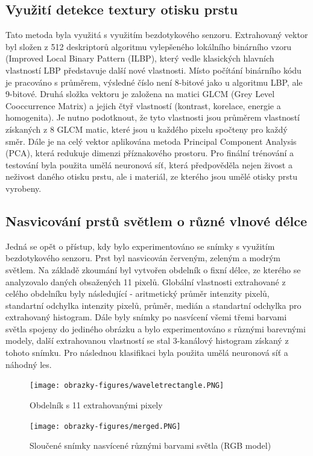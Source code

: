 \subsection*{Využití detekce textury otisku prstu}
Tato metoda byla využitá s využitím bezdotykového senzoru. Extrahovaný vektor byl složen z 512 deskriptorů algoritmu vylepšeného lokálního binárního vzoru (Improved Local Binary Pattern (ILBP), který vedle klasických hlavních vlastností LBP představuje další nové vlastnosti. Místo počítání binárního kódu je pracováno s průměrem, výsledné číslo není 8-bitové jako u algoritmu LBP, ale 9-bitové. Druhá složka vektoru je založena na matici GLCM (Grey Level Cooccurrence Matrix) a jejich čtyř vlastností (kontrast, korelace, energie a homogenita). Je nutno podotknout, že tyto vlastnosti jsou průměrem vlastností získaných z 8 GLCM matic, které jsou u každého pixelu spočteny pro každý směr. Dále je na celý vektor aplikována metoda Principal Component Analysis (PCA), která redukuje dimenzi příznakového prostoru. Pro finální trénování a testování byla použita umělá neuronová síť, která předpověděla nejen živost a neživost daného otisku prstu, ale i materiál, ze kterého jsou umělé otisky prstu vyrobeny. \cite{TouchlessANN}

\subsection*{Nasvicování prstů světlem o různé vlnové délce}
Jedná se opět o přístup, kdy bylo experimentováno se snímky s využitím bezdotykového senzoru. Prst byl nasvicován červeným, zeleným a modrým světlem. Na základě zkoumání byl vytvořen obdelník o fixní délce, ze kterého se analyzovalo daných obsažených 11 pixelů. Globální vlastnosti extrahované z celého obdelníku byly následující - aritmetický průměr intenzity pixelů, standartní odchylka intenzity pixelů, průměr, medián a standartní odchylka pro extrahovaný histogram. Dále byly snímky po nasvícení všemi třemi barvami světla spojeny do jediného obrázku a bylo experimentováno s různými barevnými modely, další extrahovanou vlastností se stal 3-kanálový histogram získaný z tohoto snímku. Pro následnou klasifikaci byla použita umělá neuronová síť a náhodný les. \cite{NewOpticalMethodsLiveness}


\begin{figure}[!htbp]
  \begin{minipage}[b]{0.5\linewidth}
    \centering
    \texttt{[image: obrazky-figures/waveletrectangle.PNG]}
    \caption{Obdelník s 11 extrahovanými pixely \cite{NewOpticalMethodsLiveness}}
  \end{minipage}
  \hspace{0.5cm}
  \begin{minipage}[b]{0.5\linewidth}
    \centering
    \texttt{[image: obrazky-figures/merged.PNG]}
    \caption{Sloučené snímky nasvícené různými barvami světla (RGB model) \cite{NewOpticalMethodsLiveness}}
  \end{minipage}
\end{figure}








